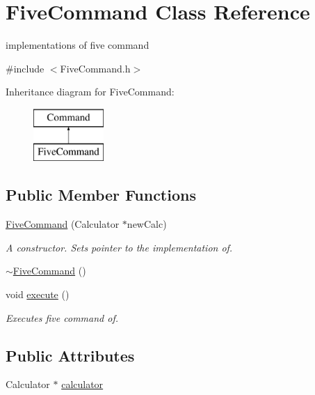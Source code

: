 \hypertarget{class_five_command}{}\section{Five\+Command Class Reference}
\label{class_five_command}


implementations of five command  




{\ttfamily \#include $<$Five\+Command.\+h$>$}

Inheritance diagram for Five\+Command\+:\begin{figure}[H]
\begin{center}
\leavevmode
\includegraphics[height=2.000000cm]{class_five_command}
\end{center}
\end{figure}
\subsection*{Public Member Functions}
\begin{DoxyCompactItemize}
\item 
\hyperlink{class_five_command_a7c39ae9c28cfcc1419acc180215ba3ba}{Five\+Command} (Calculator $\ast$new\+Calc)
\begin{DoxyCompactList}\small\item\em A constructor. Sets pointer to the implementation of. \end{DoxyCompactList}\item 
\hyperlink{class_five_command_a131404c8ba03c928aecb0f4f3888cb0b}{$\sim$\+Five\+Command} ()
\item 
void \hyperlink{class_five_command_a97cbe6f79a00cf03fc8af1dc527dc801}{execute} ()
\begin{DoxyCompactList}\small\item\em Executes five command of. \end{DoxyCompactList}\end{DoxyCompactItemize}
\subsection*{Public Attributes}
\begin{DoxyCompactItemize}
\item 
Calculator $\ast$ \hyperlink{class_five_command_a9c6694f2dff27fabf44a4bacdbb07d12}{calculator}
\end{DoxyCompactItemize}


